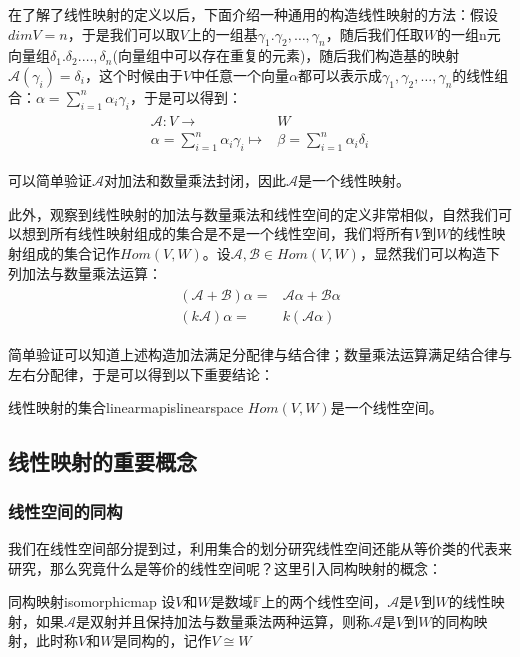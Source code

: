     在了解了线性映射的定义以后，下面介绍一种通用的构造线性映射的方法：假设$dimV=n$，于是我们可以取$V$上的一组基$\gamma_1.\gamma_2,\dots,\gamma_n$，随后我们任取$W$的一组n元向量组$\delta_1.\delta_2.\dots,\delta_n$(向量组中可以存在重复的元素)，随后我们构造基的映射$\mathscr{A}(\gamma_i)=\delta_i$，这个时候由于$V$中任意一个向量$\alpha$都可以表示成$\gamma_1,\gamma_2,\dots,\gamma_n$的线性组合：$\alpha=\sum_{i=1}^n\alpha_i\gamma_i$，于是可以得到：
    \begin{align}
        \begin{split}
            \mathscr{A}:V\rightarrow& W\\
            \alpha=\sum_{i=1}^n\alpha_i\gamma_i\mapsto& \beta=\sum_{i=1}^n\alpha_i\delta_i
        \end{split}
    \end{align}
    
    可以简单验证$\mathscr{A}$对加法和数量乘法封闭，因此$\mathscr{A}$是一个线性映射。
    
    此外，观察到线性映射的加法与数量乘法和线性空间的定义非常相似，自然我们可以想到所有线性映射组成的集合是不是一个线性空间，我们将所有$V$到$W$的线性映射组成的集合记作$Hom(V,W)$。设$\mathscr{A},\mathscr{B}\in Hom(V,W)$，显然我们可以构造下列加法与数量乘法运算：
    \begin{align}
        \begin{split}
            (\mathscr{A}+\mathscr{B})\alpha=&\mathscr{A}\alpha+\mathscr{B}\alpha\\
            (k\mathscr{A})\alpha=&k(\mathscr{A}\alpha)
        \end{split}
    \end{align}
    
    简单验证可以知道上述构造加法满足分配律与结合律；数量乘法运算满足结合律与左右分配律，于是可以得到以下重要结论：
    \begin{theorem}{线性映射的集合}{linearmapislinearspace}
        $Hom(V,W)$是一个线性空间。
    \end{theorem}
    \subsection{线性映射的重要概念}
        \subsubsection{线性空间的同构}
        我们在线性空间部分提到过，利用集合的划分研究线性空间还能从等价类的代表来研究，那么究竟什么是等价的线性空间呢？这里引入同构映射的概念：
        \begin{definition}{同构映射}{isomorphicmap}
            设$V$和$W$是数域$\mathbb{F}$上的两个线性空间，$\mathscr{A}$是$V$到$W$的线性映射，如果$\mathscr{A}$是双射并且保持加法与数量乘法两种运算，则称$\mathscr{A}$是$V$到$W$的同构映射，此时称$V$和$W$是同构的，记作$V\cong W$
        \end{definition}
        
